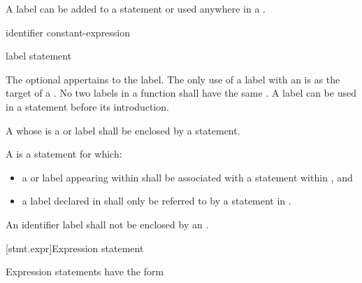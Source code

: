 \pnum
{}%
%
A label can be added to a statement or
used anywhere in a .

\begin{bnf}
\br
     identifier \terminal{:}\br
      constant-expression \terminal{:}\br
      \terminal{:}
\end{bnf}

\begin{bnf}
\br
    label statement
\end{bnf}

The optional  appertains to the label.
%
The only use of a label with an  is
as the target of a .
%
No two labels in a function shall have the same .
A label can be used in a  statement
before its introduction.

\pnum
{}%
%
%
A 
whose  is a  or  label
shall be enclosed by a  statement.

\pnum
A  is a statement  for which:
\begin{itemize}
\item
  a  or  label appearing within  shall
  be associated with a  statement within
  , and
\item
  a label declared in  shall only be referred to by a
  statement in .
\end{itemize}

\pnum
An identifier label shall not be enclosed
by an .

[stmt.expr]{Expression statement}%

\pnum
Expression statements have the form
\begin{bnf}
\br
     \terminal{;}
\end{bnf}

